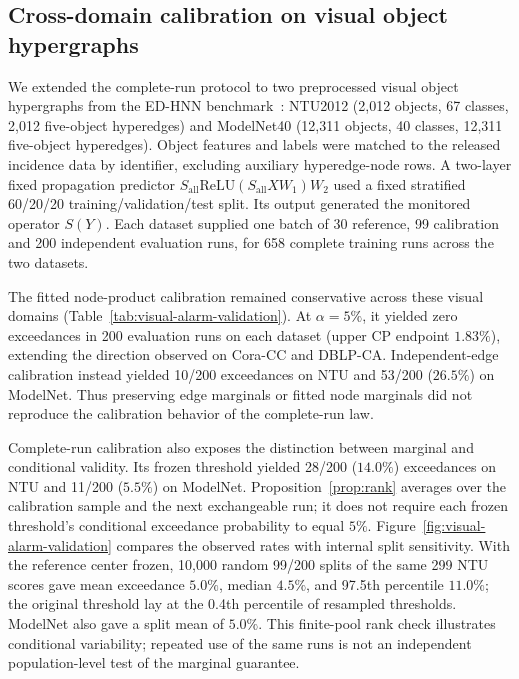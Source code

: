 \subsection{Cross-domain calibration on visual object hypergraphs}\label{sec:visual}
We extended the complete-run protocol to two preprocessed visual object
hypergraphs from the ED-HNN benchmark~\cite{wang2023edhnn}: NTU2012 (2,012 objects, 67
classes, 2,012 five-object hyperedges) and ModelNet40 (12,311 objects,
40 classes, 12,311 five-object hyperedges). Object features and labels
were matched to the released incidence data by identifier, excluding
auxiliary hyperedge-node rows. A two-layer fixed propagation predictor
$S_{\mathrm{all}}\mathrm{ReLU}(S_{\mathrm{all}}XW_1)W_2$ used a fixed
stratified 60/20/20 training/validation/test split. Its output generated
the monitored operator $S(Y)$. Each dataset supplied one batch of 30
reference, 99 calibration and 200 independent evaluation runs, for
658 complete training runs across the two datasets.

The fitted node-product calibration remained conservative across
these visual domains (Table~\ref{tab:visual-alarm-validation}). At
$\alpha=5\%$, it yielded zero exceedances in 200 evaluation runs on
each dataset (upper CP endpoint $1.83\%$), extending the direction
observed on Cora-CC and DBLP-CA. Independent-edge calibration instead
yielded 10/200 exceedances on NTU and 53/200 ($26.5\%$) on ModelNet.
Thus preserving edge marginals or fitted node marginals did not
reproduce the calibration behavior of the complete-run law.



Complete-run calibration also exposes the distinction between marginal
and conditional validity. Its frozen threshold yielded 28/200
($14.0\%$) exceedances on NTU and 11/200 ($5.5\%$) on ModelNet.
Proposition~\ref{prop:rank} averages over the calibration
sample and the next exchangeable run; it does not require each frozen
threshold's conditional exceedance probability to equal $5\%$.
Figure~\ref{fig:visual-alarm-validation} compares the observed rates
with internal split sensitivity. With the reference center frozen,
10,000 random 99/200 splits of the same 299 NTU scores gave mean
exceedance $5.0\%$, median $4.5\%$, and 97.5th percentile $11.0\%$;
the original threshold lay at the 0.4th percentile of resampled
thresholds. ModelNet also gave a split mean of $5.0\%$. This
finite-pool rank check illustrates conditional variability; repeated
use of the same runs is not an independent population-level test of
the marginal guarantee.

